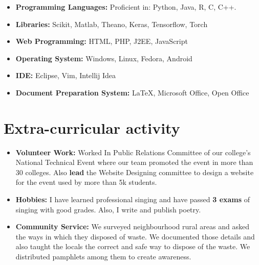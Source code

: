 \documentclass[11pt,a4paper,sans]{moderncv}        %
\begin{document}
\begin{itemize}

\item \textbf{Programming Languages:} Proficient in: Python, Java, R, C, C++.

\vspace{3pt}

\item \textbf{Libraries:} Scikit, Matlab, Theano, Keras, Tensorflow, Torch

\vspace{3pt}

\item \textbf{Web Programming:} HTML, PHP, J2EE, JavaScript

\vspace{3pt}

\item \textbf{Operating System:} Windows, Linux, Fedora, Android

\vspace{3pt}

\item \textbf{IDE:} Eclipse, Vim, Intellij Idea

\vspace{3pt}

\item \textbf{Document Preparation System:} LaTeX, Microsoft Office, Open Office

\end{itemize}

\section{Extra-curricular activity}

\vspace{3pt}

\begin{itemize}

\item\textbf{Volunteer Work:} Worked In Public Relations Committee of our college's National Technical Event where our team promoted the event in more than 30 colleges. Also \textbf{lead} the Website Designing committee to design a website for the event used by more than 5k students.

\vspace{3pt}

\item\textbf{Hobbies:} I have learned professional singing and have passed \textbf{3 exams} of singing with good grades. Also, I write and publish poetry.

\vspace{3pt}

\item\textbf{Community Service:} We surveyed neighbourhood rural areas and asked the ways in which they disposed of waste. We documented those details and also taught the locals the correct and safe way to dispose of the waste. We distributed pamphlets among them to create awareness.

\end{itemize}
\end{document}
